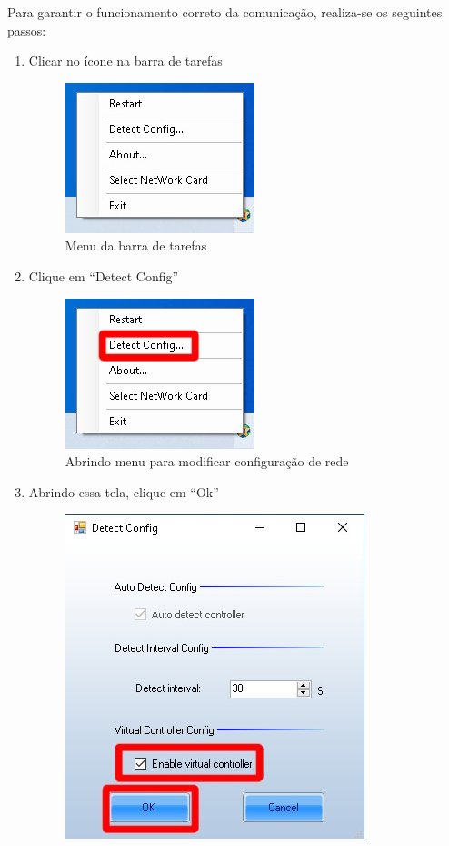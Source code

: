 \documentclass[12pt, a4paper]{article}
\begin{document}
Para garantir o funcionamento correto da comunicação, realiza-se os seguintes passos:
\begin{enumerate}
	\item Clicar no ícone na barra de tarefas
	\begin{figure}[!htb]
		\centering
		\includegraphics{menuRede.jpg}
		\caption{\label{fig:menuRede.jpg}Menu da barra de tarefas}
	\end{figure}
	\newpage
	\item Clique em ``Detect Config''
	\begin{figure}[!htb]
		\centering
		\includegraphics{menuRede1.jpg}
		\caption{\label{fig:menuRede1.jpg}Abrindo menu para modificar configuração de rede}
	\end{figure}
	\item Abrindo essa tela, clique em ``Ok''
	\begin{figure}[!htb]
		\centering
		\includegraphics[scale=.8]{detectConfig.jpeg}

\end{figure}
\end{enumerate}
\end{document}
